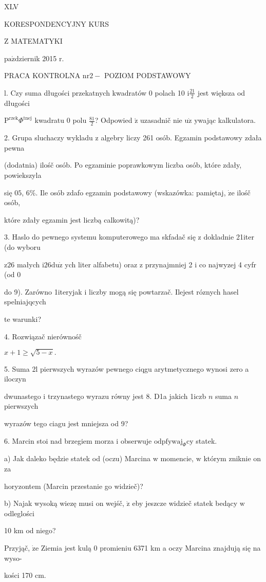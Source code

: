 \documentclass[a4paper,12pt]{article}
\begin{document}
XLV

KORESPONDENCYJNY KURS

Z MATEMATYKI

$\mathrm{p}\mathrm{a}\acute{\mathrm{z}}$dziernik 2015 $\mathrm{r}.$

PRACA KONTROLNA $\mathrm{n}\mathrm{r} 2-$ POZIOM PODSTAWOWY

l. Czy suma długości przekatnych kwadratów $0$ polach 10 $\mathrm{i} \displaystyle \frac{21}{2}$ jest większa od długości

$\mathrm{P}^{\mathrm{r}\mathrm{z}\mathrm{e}\mathrm{k}}\Phi^{\mathrm{t}\mathrm{n}\mathrm{e}\mathrm{j}}$ kwadratu $0$ polu $\displaystyle \frac{81}{2}$? Odpowied $\acute{\mathrm{z}}$ uzasadnič nie $\mathrm{u}\dot{\mathrm{z}}$ ywając kalkulatora.

2. Grupa sluchaczy wykladu $\mathrm{z}$ algebry liczy 261 osób. Egzamin podstawowy zdała pewna

(dodatnia) ilośč osób. Po egzaminie poprawkowym liczba osób, które zdały, powiekszyla

się $0 5$, 6\%. Ile osób zdafo egzamin podstawowy (wskazówka: pamiętaj, $\dot{\mathrm{z}}\mathrm{e}$ ilośč osób,

które zdały egzamin jest liczbą calkowitą)?

3. Haslo do pewnego systemu komputerowego ma skfadač się $\mathrm{z}$ dokladnie 21iter (do wyboru

$\mathrm{z}26$ małych $\mathrm{i}26\mathrm{d}\mathrm{u}\dot{\mathrm{z}}$ ych liter alfabetu) oraz $\mathrm{z}$ przynajmniej 2 $\mathrm{i}$ co najwyzej 4 cyfr (od 0

do 9). Zarówno 1iteryjak $\mathrm{i}$ liczby mogą się powtarzač. Ilejest róznych hasel spelniajqcych

te warunki?

4. Rozwiązač nierównośč

$x+1\geq\sqrt{5-x}.$

5. Suma 2l pierwszych wyrazów pewnego ciqgu arytmetycznego wynosi zero a iloczyn

dwunastego $\mathrm{i}$ trzynastego wyrazu równy jest 8. D1a jakich 1iczb $n$ suma $n$ pierwszych

wyrazów tego ciagu jest mniejsza od 9?

6. Marcin stoi nad brzegiem morza $\mathrm{i}$ obserwuje $\mathrm{o}\mathrm{d}\mathrm{p}\mathrm{f}\mathrm{y}\mathrm{w}\mathrm{a}\mathrm{j}_{\Phi}\mathrm{c}\mathrm{y}$ statek.

a) Jak daleko będzie statek od (oczu) Marcina $\mathrm{w}$ momencie, $\mathrm{w}$ którym zniknie on za

horyzontem (Marcin przestanie go widzieč)?

b) Najak wysoką wiezę musi on wejśč, $\dot{\mathrm{z}}$ eby jeszcze widzieč statek bedący $\mathrm{w}$ odleglości

10 km od niego?

Przyjąč, $\dot{\mathrm{z}}\mathrm{e}$ Ziemia jest kulą $0$ promieniu 6371 km a oczy Marcina znajdują się na wyso-

kości 170 cm.
\end{document}
